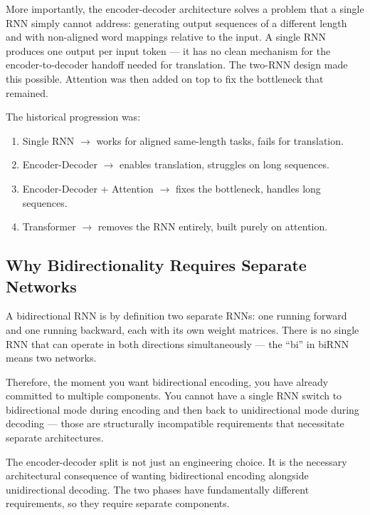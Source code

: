 More importantly, the encoder-decoder architecture solves a problem that a single RNN
simply cannot address: generating output sequences of a different length and with
non-aligned word mappings relative to the input. A single RNN produces one output per
input token --- it has no clean mechanism for the encoder-to-decoder handoff needed for
translation. The two-RNN design made this possible. Attention was then added on top to
fix the bottleneck that remained.

The historical progression was:
\begin{enumerate}
    \item Single RNN $\to$ works for aligned same-length tasks, fails for translation.
    \item Encoder-Decoder $\to$ enables translation, struggles on long sequences.
    \item Encoder-Decoder + Attention $\to$ fixes the bottleneck, handles long sequences.
    \item Transformer $\to$ removes the RNN entirely, built purely on attention.
\end{enumerate}

\subsection{Why Bidirectionality Requires Separate Networks}

A bidirectional RNN is by definition two separate RNNs: one running forward and one
running backward, each with its own weight matrices. There is no single RNN that can
operate in both directions simultaneously --- the ``bi'' in biRNN means two networks.

Therefore, the moment you want bidirectional encoding, you have already committed to
multiple components. You cannot have a single RNN switch to bidirectional mode during
encoding and then back to unidirectional mode during decoding --- those are structurally
incompatible requirements that necessitate separate architectures.

The encoder-decoder split is not just an engineering choice. It is the necessary
architectural consequence of wanting bidirectional encoding alongside unidirectional
decoding. The two phases have fundamentally different requirements, so they require
separate components.